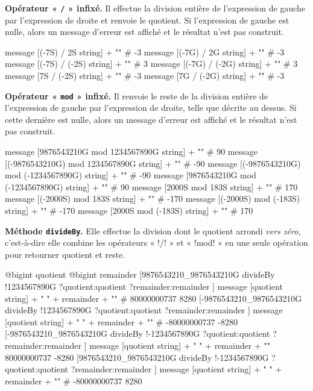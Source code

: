 \textbf{Opérateur « \texttt{/} » infixé.} Il effectue la division entière de l'expression de gauche par l'expression de droite et renvoie le quotient. Si l'expression de gauche est nulle, alors un message d'erreur est affiché et le résultat n'est pas construit.

\begin{galgas}
  message [(-7S) / 2S string] + "\n" # -3
  message [(-7G) / 2G string] + "\n" # -3
  message [(-7S) / (-2S) string] + "\n" # 3
  message [(-7G) / (-2G) string] + "\n" # 3
  message [7S / (-2S) string] + "\n" # -3
  message [7G / (-2G) string] + "\n" # -3
\end{galgas}



\textbf{Opérateur « \texttt{mod} » infixé.} Il renvoie le reste de la division entière de l'expression de gauche par l'expression de droite, telle que décrite au dessus. Si cette dernière est nulle, alors un message d'erreur est affiché et le résultat n'est pas construit.

\begin{galgas}
  message [9876543210G mod 1234567890G string] + "\n" # 90
  message [(-9876543210G) mod 1234567890G string] + "\n" # -90
  message [(-9876543210G) mod (-1234567890G) string] + "\n"  # -90
  message [9876543210G mod (-1234567890G) string] + "\n"  # 90
  message [2000S mod 183S string] + "\n" # 170
  message [(-2000S) mod 183S string] + "\n" # -170
  message [(-2000S) mod (-183S) string] + "\n" # -170
  message [2000S mod (-183S) string] + "\n" # 170
\end{galgas}




\textbf{Méthode \texttt{divideBy}.} Elle effectue la division dont le quotient arrondi \emph{vers zéro}, c'est-à-dire elle combine les opérateurs « \ggs!/! » et « \ggs!mod! » en une seule opération pour retourner quotient et reste.

\begin{galgas}
  @bigint quotient
  @bigint remainder
  [9876543210_9876543210G divideBy
    !1234567890G
    ?quotient:quotient
    ?remainder:remainder
  ]
  message [quotient string] + " " + remainder + "\n" # 80000000737 8280
  [-9876543210_9876543210G divideBy
    !1234567890G
    ?quotient:quotient
    ?remainder:remainder
  ]
  message [quotient string] + " " + remainder + "\n" # -80000000737 -8280
  [-9876543210_9876543210G divideBy
    !-1234567890G
    ?quotient:quotient
    ?remainder:remainder
  ]
  message [quotient string] + " " + remainder + "\n" 80000000737 -8280
  [9876543210_9876543210G divideBy
    !-1234567890G
    ?quotient:quotient
    ?remainder:remainder
  ]
  message [quotient string] + " " + remainder + "\n" # -80000000737 8280
\end{galgas}






